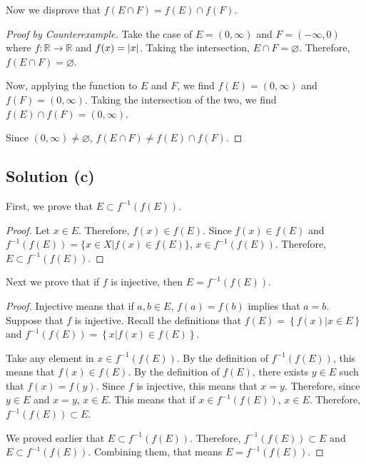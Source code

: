 \documentclass[11pt]{article}
\begin{document}
        Now we disprove that $f(E \cap F) = f(E) \cap f(F)$.
        \begin{proof}[Proof by Counterexample]
            Take the case of $E = (0,\infty)$ and $F = (-\infty, 0)$ where $f: \mathbb{R} \to \mathbb{R}$ and $f(x) = \left| x \right|$.
            Taking the intersection, $E \cap F = \varnothing$.
            Therefore, $f(E \cap F) = \varnothing$.

            Now, applying the function to $E$ and $F$, we find $f(E) = (0,\infty)$ and $f(F) = (0,\infty)$.
            Taking the intersection of the two, we find $f(E) \cap f(F) = (0,\infty)$.
            
            Since $(0,\infty) \neq \varnothing$, $f(E \cap F) \neq f(E) \cap f(F)$.
        \end{proof}

    \subsection{Solution (c)}
        First, we prove that $E \subset f^{-1}(f(E))$.
        \begin{proof}
            Let $x \in E$.
            Therefore, $f(x) \in f(E)$.
            Since $f(x) \in f(E)$ and $f^{-1}(f(E)) = \{x \in X \Big| f(x) \in f(E)\}$, $x \in f^{-1}(f(E))$.
            Therefore, $E \subset f^{-1}(f(E))$.
        \end{proof}

        Next we prove that if $f$ is injective, then $E = f^{-1}(f(E))$.
        \begin{proof}
            Injective means that if $a, b \in E$, $f(a) = f(b)$ implies that $a = b$.
            Suppose that $f$ is injective.
            Recall the definitions that $f(E) = \left\{f(x) \Big| x \in E\right\}$ and $f^{-1}(f(E)) = \left\{ x \Big| f(x) \in f(E) \right\}$.

            Take any element in $x \in f^{-1}(f(E))$.
            By the definition of $f^{-1}(f(E))$, this means that $f(x) \in f(E)$.
            By the definition of $f(E)$, there exists $y \in E$ such that $f(x) = f(y)$.
            Since $f$ is injective, this means that $x = y$.
            Therefore, since $y \in E$ and $x = y$, $x \in E$.
            This means that if $x \in f^{-1}(f(E))$, $x \in E$.
            Therefore, $f^{-1}(f(E)) \subset E$.

            We proved earlier that $E \subset f^{-1}(f(E))$.
            Therefore, $f^{-1}(f(E)) \subset E$ and $E \subset f^{-1}(f(E))$.
            Combining them, that means $E = f^{-1}(f(E))$.
        \end{proof}
\end{document}
